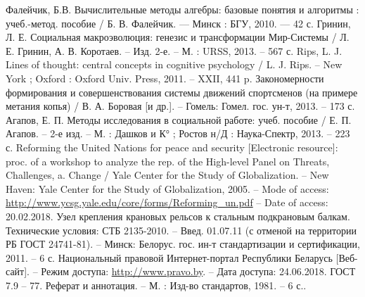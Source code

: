 \documentclass[a4paper, 14pt]{extreport}
\begin{document}
\newpage
\begin{thebibliography}{9}
	 Фалейчик, Б.В. Вычислительные методы алгебры: базовые понятия и алгоритмы : учеб.-метод. пособие / Б. В. Фалейчик. — Минск : БГУ, 2010. — 42 с.
	 Гринин, Л. Е. Социальная макроэволюция: генезис и трансформации Мир-Системы / Л. Е. Гринин, А. В. Коротаев. – Изд. 2-е. – М. : URSS, 2013. – 567 с.
	 Rips, L. J. Lines of thought: central concepts in cognitive psychology / L. J. Rips. – New York ; Oxford : Oxford Univ. Press, 2011. – XXII, 441 p.
	 Закономерности формирования и совершенствования системы движений спортсменов (на примере метания копья) / В. А. Боровая [и др.]. – Гомель: Гомел. гос. ун-т, 2013. – 173 с.
	 Агапов, Е. П. Методы исследования в социальной работе: учеб. пособие / Е. П. Агапов. – 2-е изд. – М. : Дашков и К° ; Ростов н/Д : Наука-Спектр, 2013. – 223 с.
	 Reforming the United Nations for peace and security [Electronic resource]: proc. of a workshop to analyze the rep. of the High-level Panel on Threats, Challenges, a. Change / Yale Center for the Study of Globalization. – New Haven: Yale Center for the Study of Globalization, 2005. – Mode of access:\href{ http://www.ycsg.yale.edu/core/forms/Reforming_un.pdf}{ http://www.ycsg.yale.edu/core/forms/Reforming_un.pdf}
	– Date of access: 20.02.2018.
	 Узел крепления крановых рельсов к стальным подкрановым балкам. Технические условия: СТБ 2135-2010. – Введ. 01.07.11 (с отменой на территории РБ ГОСТ 24741-81). – Минск: Белорус. гос. ин-т стандартизации и сертификации, 2011. – 6 с. 
	 	Национальный правовой Интернет-портал Республики Беларусь [Веб-сайт]. – Режим доступа: \href{http://www.pravo.by}{http://www.pravo.by}. – Дата доступа: 24.06.2018.
	 	ГОСТ 7.9 – 77. Реферат и аннотация. – М. : Изд-во стандартов, 1981. – 6 с..\right 
\end{thebibliography}
\end{document}
